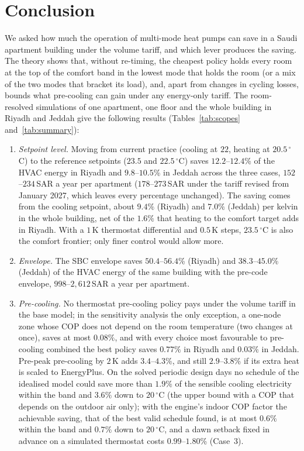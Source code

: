 \documentclass[10pt,a4paper,twocolumn]{article}
\theoremstyle{definition}
\begin{document}
\section{Conclusion}\label{sec:conclusion}
We asked how much the operation of multi-mode heat pumps can save in a Saudi apartment building under the volume tariff, and which lever produces the saving. The theory shows that, without re-timing, the cheapest policy holds every room at the top of the comfort band in the lowest mode that holds the room (or a mix of the two modes that bracket its load), and, apart from changes in cycling losses, bounds what pre-cooling can gain under any energy-only tariff. The room-resolved simulations of one apartment, one floor and the whole building in Riyadh and Jeddah give the following results (Tables~\ref{tab:scopes} and~\ref{tab:summary}):
\begin{enumerate}[label=(\arabic*),leftmargin=1.6em,itemsep=2pt,topsep=2pt]
\item \emph{Setpoint level.} Moving from current practice (cooling at $22$, heating at $20.5\,^{\circ}$C) to the reference setpoints ($23.5$ and $22.5\,^{\circ}$C) saves $12.2$--$12.4$\% of the HVAC energy in Riyadh and $9.8$--$10.5$\% in Jeddah across the three cases, $152$--$234\,$SAR a year per apartment ($178$--$273\,$SAR under the tariff revised from January 2027, which leaves every percentage unchanged). The saving comes from the cooling setpoint, about $9.4\%$ (Riyadh) and $7.0\%$ (Jeddah) per kelvin in the whole building, net of the $1.6\%$ that heating to the comfort target adds in Riyadh. With a $1\,$K thermostat differential and $0.5\,$K steps, $23.5\,^{\circ}$C is also the comfort frontier; only finer control would allow more.
\item \emph{Envelope.} The SBC envelope saves $50.4$--$56.4$\% (Riyadh) and $38.3$--$45.0$\% (Jeddah) of the HVAC energy of the same building with the pre-code envelope, $998$--$2{,}612\,$SAR a year per apartment.
\item \emph{Pre-cooling.} No thermostat pre-cooling policy pays under the volume tariff in the base model; in the sensitivity analysis the only exception, a one-node zone whose COP does not depend on the room temperature (two changes at once), saves at most $0.08\%$, and with every choice most favourable to pre-cooling combined the best policy saves $0.77\%$ in Riyadh and $0.03\%$ in Jeddah. Pre-peak pre-cooling by $2\,$K adds $3.4$--$4.3$\%, and still $2.9$--$3.8$\% if its extra heat is scaled to EnergyPlus. On the solved periodic design days no schedule of the idealised model could save more than $1.9\%$ of the sensible cooling electricity within the band and $3.6\%$ down to $20\,^{\circ}$C (the upper bound with a COP that depends on the outdoor air only); with the engine's indoor COP factor the achievable saving, that of the best valid schedule found, is at most $0.6\%$ within the band and $0.7\%$ down to $20\,^{\circ}$C, and a dawn setback fixed in advance on a simulated thermostat costs $0.99$--$1.80$\% (Case~3).

\end{enumerate}
\end{document}
